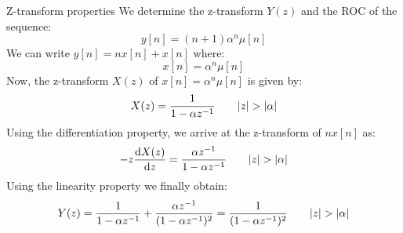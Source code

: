 \documentclass[../../main/main.tex]{subfiles}
\begin{document}
\begin{example}{Z-transform properties}{}
    We determine the z-transform \( Y(z) \) and the ROC of the sequence:
    \begin{equation}
        y[n]
        =
        (n+1) \alpha^{n} \mu[n]
        \label{eq:L14_S69_1}
    \end{equation}
    We can write \( y[n] = nx[n] + x[n] \) where:
    \begin{equation}
        x[n]
        =
        \alpha^{n} \mu[n]
        \label{eq:L14_S69_2}
    \end{equation}
    Now, the z-transform \( X(z) \) of \( x[n] = \alpha^{n} \mu[n] \) is given by:
    \begin{equation}
        X(z)
        =
        \frac{1}{1 - \alpha z^{-1}}
        \qquad
        \abs{z} > \abs{\alpha}
        \label{eq:L14_S70_1}
    \end{equation}
    Using the differentiation property, we arrive at the z-transform of \( nx[n] \) as:
    \begin{equation}
        -z \dv{X(z)}{z}
        =
        \frac{\alpha z^{-1}}{1 - \alpha z^{-1}}
        \qquad
        \abs{z} > \abs{\alpha}
        \label{eq:L14_S70_2}
    \end{equation}
    Using the linearity property we finally obtain:
    \begin{equation}
        Y(z)
        =
        \frac{1}{1 - \alpha z^{-1}} + \frac{\alpha z^{-1}}{(1 - \alpha z^{-1})^2}
        =
        \frac{1}{(1 - \alpha z^{-1})^2}
        \qquad
        \abs{z} > \abs{\alpha}
        \label{eq:L14_S71_1}
    \end{equation}
\end{example}
\end{document}
